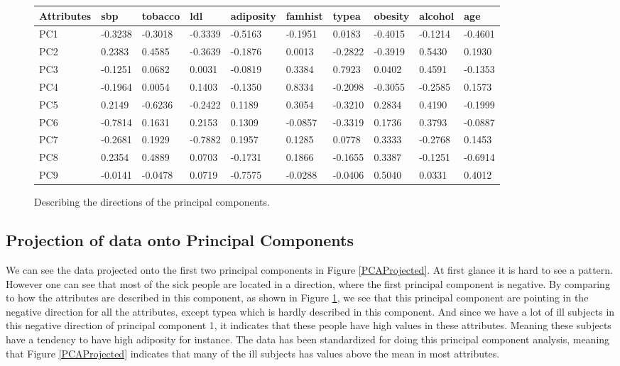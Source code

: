 \begin{figure}[H]
\begin{tabular}{ | l | l | l | l | l | l | l | l | l | l | }
\hline
Attributes & sbp & tobacco & ldl & adiposity & famhist & typea & obesity & alcohol & age \\ \hline
PC1 & -0.3238 & -0.3018 &  -0.3339 &  -0.5163 & -0.1951 & 0.0183 & -0.4015 & -0.1214 & -0.4601 \\ \hline
PC2 & 0.2383 &  0.4585 & -0.3639 &  -0.1876 &  0.0013 &   -0.2822 & -0.3919 & 0.5430 & 0.1930 \\ \hline
PC3 & -0.1251 & 0.0682 &  0.0031 & -0.0819 &  0.3384 & 0.7923 & 0.0402 &  0.4591 & -0.1353 \\ \hline
PC4 & -0.1964 & 0.0054 & 0.1403 & -0.1350 &  0.8334 & -0.2098 & -0.3055 & -0.2585 &  0.1573 \\ \hline
PC5 & 0.2149 & -0.6236 & -0.2422 &  0.1189 &  0.3054 & -0.3210 & 0.2834 &  0.4190 &  -0.1999 \\ \hline
PC6 & -0.7814 &  0.1631 &   0.2153 &  0.1309 & -0.0857 & -0.3319 & 0.1736 & 0.3793 & -0.0887 \\ \hline
PC7 & -0.2681 &  0.1929 & -0.7882 &  0.1957 &  0.1285 &  0.0778 & 0.3333 & -0.2768 &  0.1453 \\ \hline
PC8 & 0.2354 &  0.4889 &  0.0703 & -0.1731 & 0.1866 & -0.1655 &   0.3387 & -0.1251 & -0.6914 \\ \hline
PC9 & -0.0141 & -0.0478 & 0.0719 & -0.7575 & -0.0288 & -0.0406 & 0.5040 & 0.0331 & 0.4012 \\ \hline
\end{tabular}
\caption{Describing the directions of the principal components.}
\label{PCADirections}
\end{figure}

\subsection{Projection of data onto Principal Components}

We can see the data projected onto the first two principal components in Figure \ref{PCAProjected}. At first glance it is hard to see a pattern. However one can see that most of the sick people are located in a direction, where the first principal component is negative. By comparing to how the attributes are described in this component, as shown in Figure \ref{PCADirections}, we see that this principal component are pointing in the negative direction for all the attributes, except typea which is hardly described in this component. And since we have a lot of ill subjects in this negative direction of principal component 1, it indicates that these people have high values in these attributes. Meaning these subjects have a tendency to have high adiposity for instance. The data has been standardized for doing this principal component analysis, meaning that Figure \ref{PCAProjected} indicates that many of the ill subjects has values above the mean in most attributes.


